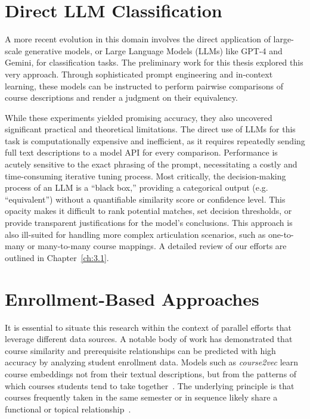 \section{Direct LLM Classification}
A more recent evolution in this domain involves the direct application of large-scale generative models, or Large Language Models (LLMs) like GPT-4 and Gemini, for classification tasks. The preliminary work for this thesis explored this very approach. Through sophisticated prompt engineering and in-context learning, these models can be instructed to perform pairwise comparisons of course descriptions and render a judgment on their equivalency.  

While these experiments yielded promising accuracy, they also uncovered significant practical and theoretical limitations. The direct use of LLMs for this task is computationally expensive and inefficient, as it requires repeatedly sending full text descriptions to a model API for every comparison. Performance is acutely sensitive to the exact phrasing of the prompt, necessitating a costly and time-consuming iterative tuning process. Most critically, the decision-making process of an LLM is a ``black box,'' providing a categorical output (e.g. ``equivalent'') without a quantifiable similarity score or confidence level. This opacity makes it difficult to rank potential matches, set decision thresholds, or provide transparent justifications for the model's conclusions. This approach is also ill-suited for handling more complex articulation scenarios, such as one-to-many or many-to-many course mappings.  A detailed review of our efforts are outlined in Chapter~\ref{ch:3.1}.

\section{Enrollment-Based Approaches}
It is essential to situate this research within the context of parallel efforts that leverage different data sources. A notable body of work has demonstrated that course similarity and prerequisite relationships can be predicted with high accuracy by analyzing student enrollment data. Models such as \emph{course2vec} learn course embeddings not from their textual descriptions, but from the patterns of which courses students tend to take together~\cite{pardos2018connectionistrecommendationwildutility}. The underlying principle is that courses frequently taken in the same semester or in sequence likely share a functional or topical relationship~\cite{pardos2018connectionistrecommendationwildutility}.

